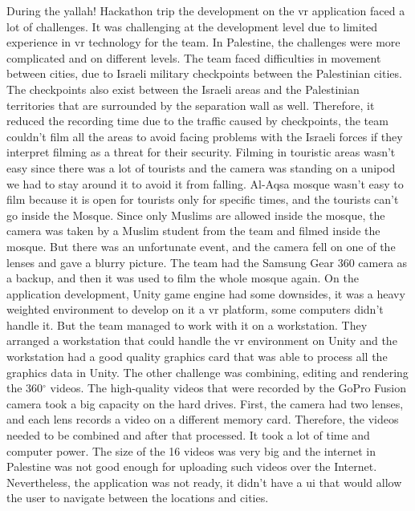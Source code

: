 During the \acrshort{yallah!} Hackathon trip the development on the \acrshort{vr} application faced a lot of challenges. It was challenging at the development level due to limited experience in \acrshort{vr} technology for the team. In Palestine, the challenges were more complicated and on different levels. The team faced difficulties in movement between cities, due to Israeli military checkpoints between the Palestinian cities. The checkpoints also exist between the Israeli areas and the Palestinian territories that are surrounded by the separation wall as well. Therefore, it reduced the recording time due to the traffic caused by checkpoints, the team couldn't film all the areas to avoid facing problems with the Israeli forces if they interpret filming as a threat for their security. Filming in touristic areas wasn’t easy since there was a lot of tourists and the camera was standing on a unipod we had to stay around it to avoid it from falling. Al-Aqsa mosque wasn’t easy to film because it is open for tourists only for specific times, and the tourists can’t go inside the Mosque. Since only Muslims are allowed inside the mosque, the camera was taken by a Muslim student from the team and filmed inside the mosque. But there was an unfortunate event, and the camera fell on one of the lenses and gave a blurry picture. The team had the Samsung Gear 360 camera as a backup, and then it was used to film the whole mosque again. On the application development, Unity game engine had some downsides, it was a heavy weighted environment to develop on it a \acrshort{vr} platform, some computers didn’t handle it. But the team managed to work with it on a workstation. They arranged a workstation that could handle the \acrshort{vr} environment on Unity and the workstation had a good quality graphics card that was able to process all the graphics data in Unity. The other challenge was combining, editing and rendering the 360$^{\circ}$ videos. The high-quality videos that were recorded by the GoPro Fusion camera took a big capacity on the hard drives. First, the camera had two lenses, and each lens records a video on a different memory card. Therefore, the videos needed to be combined and after that processed. It took a lot of time and computer power. The size of the 16 videos was very big and the internet in Palestine was not good enough for uploading such videos over the Internet. Nevertheless, the application was not ready, it didn't have a \acrfull{ui} that would allow the user to navigate between the locations and cities. 
